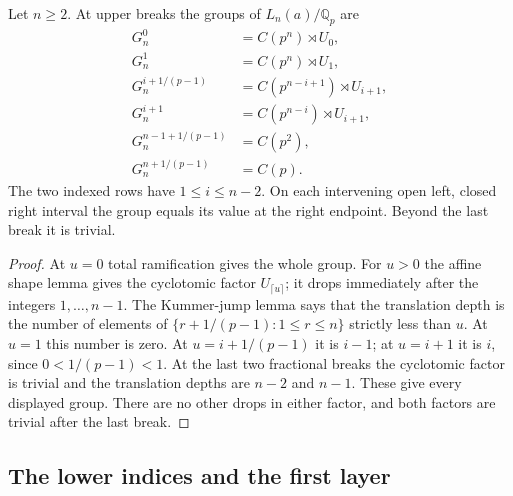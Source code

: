 \begin{theorem}
\label{ft:upper-filtration}
\leanok{}
Let $n\geq2$. At upper breaks the groups of $L_n(a)/\mathbb Q_p$ are
\[
\begin{aligned}
 G_n^0&=C(p^n)\rtimes U_0,\\
 G_n^1&=C(p^n)\rtimes U_1,\\
 G_n^{i+1/(p-1)}&=C(p^{n-i+1})\rtimes U_{i+1},\\
 G_n^{i+1}&=C(p^{n-i})\rtimes U_{i+1},\\
 G_n^{n-1+1/(p-1)}&=C(p^2),\\
 G_n^{n+1/(p-1)}&=C(p).
\end{aligned}
\]
The two indexed rows have $1\leq i\leq n-2$. On each intervening open
left, closed right interval the group equals its value at the right
endpoint. Beyond the last break it is trivial.
\end{theorem}
\begin{proof}
At $u=0$ total ramification gives the whole group. For $u>0$ the affine
shape lemma gives the cyclotomic factor $U_{\lceil u\rceil}$; it drops
immediately after the integers $1,\ldots,n-1$. The Kummer-jump lemma says
that the translation depth is the number of elements of
$\{r+1/(p-1):1\leq r\leq n\}$ strictly less than $u$.
At $u=1$ this number is zero. At $u=i+1/(p-1)$ it is $i-1$; at
$u=i+1$ it is $i$, since $0<1/(p-1)<1$. At the last two fractional
breaks the cyclotomic factor is trivial and the translation depths are
$n-2$ and $n-1$. These give every displayed group. There are no other
drops in either factor, and both factors are trivial after the last break.
\end{proof}

\subsection{The lower indices and the first layer}

